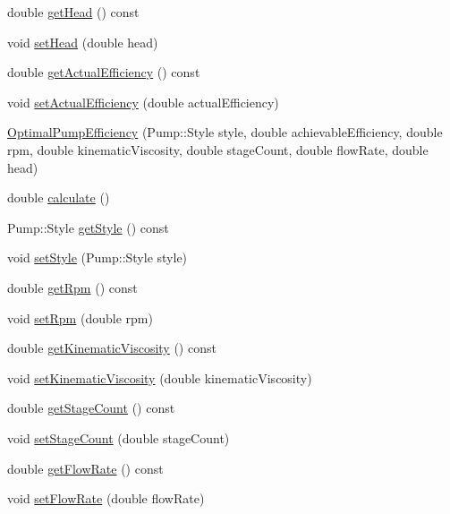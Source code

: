 \begin{DoxyCompactItemize}
double \hyperlink{class_optimal_pump_efficiency_af31fdb10aabc197ff7536c9bbe006573}{get\+Head} () const
\item 
void \hyperlink{class_optimal_pump_efficiency_ac317c900ec68797cf051977147ea33da}{set\+Head} (double head)
\item 
double \hyperlink{class_optimal_pump_efficiency_aa2ac8a7c61bc28f82e30cb44b9c21008}{get\+Actual\+Efficiency} () const
\item 
void \hyperlink{class_optimal_pump_efficiency_a539b20c53c7ba6a5983a60d74be4ac9e}{set\+Actual\+Efficiency} (double actual\+Efficiency)
\item 
\hyperlink{class_optimal_pump_efficiency_ae07626ea079ff810ac6518d54c52b24a}{Optimal\+Pump\+Efficiency} (Pump\+::\+Style style, double achievable\+Efficiency, double rpm, double kinematic\+Viscosity, double stage\+Count, double flow\+Rate, double head)
\item 
double \hyperlink{class_optimal_pump_efficiency_ac40720d1fcdf40d8b364df37e58e7f4d}{calculate} ()
\item 
Pump\+::\+Style \hyperlink{class_optimal_pump_efficiency_a601fe15e9acc23112743fabe417030fb}{get\+Style} () const
\item 
void \hyperlink{class_optimal_pump_efficiency_ab6b85c8c08d6641c5375c65436f16a2f}{set\+Style} (Pump\+::\+Style style)
\item 
double \hyperlink{class_optimal_pump_efficiency_a58e8a430ced612e0518abd07fb30b085}{get\+Rpm} () const
\item 
void \hyperlink{class_optimal_pump_efficiency_afc6b6f46b4e289efc8819249ad1c9fb5}{set\+Rpm} (double rpm)
\item 
double \hyperlink{class_optimal_pump_efficiency_a8c2f7fcacce2b42ed83f29aec2d4671e}{get\+Kinematic\+Viscosity} () const
\item 
void \hyperlink{class_optimal_pump_efficiency_a00017e0bd100beb2f4b0bf2db5e3687f}{set\+Kinematic\+Viscosity} (double kinematic\+Viscosity)
\item 
double \hyperlink{class_optimal_pump_efficiency_aac0c1a4a6492bf00b245c2a61d100eaa}{get\+Stage\+Count} () const
\item 
void \hyperlink{class_optimal_pump_efficiency_a5b0b2a24a87c1c8fc92aa96c6ba4b727}{set\+Stage\+Count} (double stage\+Count)
\item 
double \hyperlink{class_optimal_pump_efficiency_a77c6618681b0fd3a0fc02dc49d16ee99}{get\+Flow\+Rate} () const
\item 
void \hyperlink{class_optimal_pump_efficiency_a90067b57c559fd3274fb8d6e00f6221d}{set\+Flow\+Rate} (double flow\+Rate)

\end{DoxyCompactItemize}
